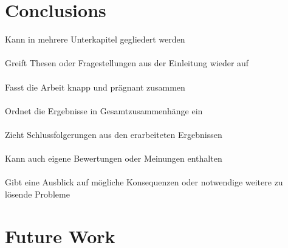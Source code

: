\documentclass[11pt,oneside,openright]{mpreport}
\begin{document}
\chapter{Conclusions}
Kann in mehrere Unterkapitel gegliedert werden\\\\
Greift Thesen oder Fragestellungen aus der Einleitung wieder auf\\\\
Fasst die Arbeit knapp und prägnant zusammen\\\\
Ordnet die Ergebnisse in Gesamtzusammenhänge ein\\\\
Zieht Schlussfolgerungen aus den erarbeiteten Ergebnissen\\\\
Kann auch eigene Bewertungen oder Meinungen enthalten\\\\
Gibt eine Ausblick auf mögliche Konsequenzen oder notwendige weitere zu lösende Probleme
\chapter{Future Work}

\printbibliography
\end{document}
